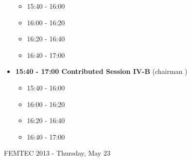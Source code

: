 \documentclass[10pt, A4]{article}%
\begin{document}
\begin{itemize}
\begin{itemize}
    \item 15:40 - 16:00
    \item 16:00 - 16:20 
    \item 16:20 - 16:40 
    \item 16:40 - 17:00
  \end{itemize}
  \item {\bf 15:40 - 17:00 Contributed Session IV-B} (chairman ) 
  \begin{itemize}
    \item 15:40 - 16:00
    \item 16:00 - 16:20 
    \item 16:20 - 16:40 
    \item 16:40 - 17:00
  \end{itemize}  
\end{itemize}

\newpage
\newpage

\centerline{\huge FEMTEC 2013 - Thursday, May 23}
\vspace{4mm}
\end{document}

